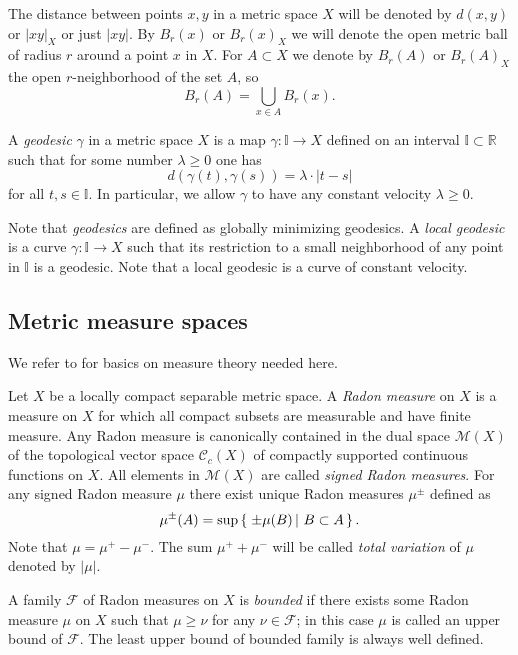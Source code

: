 \documentclass[12pt,leqno,intlimits]{amsart}
\numberwithin{equation}{section}
\theoremstyle{definition}
\theoremstyle{remark}
\newcommand{\R}{\mathbb{R}}
\newcommand{\II}{\mathbb{I}}
\def\:{\colon}
\newcommand*{\set}[2]{\left\{\,\left.{#1}\vphantom{#2}\,\right|\,{#2}\,\right\}}
\begin{document}
The distance between points $x,y$ in a metric space $X$ will be denoted by $d(x,y)$ or $|xy|_X$ or just $|xy|$. %
By $B_r(x)$ or $B_r(x)_X$ we will denote the open metric ball of radius $r$ around a point $x$ in $X$. 
For $A\subset X$ we denote by $B_r(A)$ or $B_r(A)_X$ the open $r$-neighborhood of the set $A$, so
\[B_r (A) =\bigcup_{x\in A} B_r (x).\]

A \emph{geodesic} $\gamma$ in a metric space $X$ is  a map $\gamma\:\II\to X$ defined on an interval $\II \subset \R$ such that for some number $\lambda \geq 0$ one has
\[d(\gamma (t),\gamma (s)) =\lambda \cdot |t-s|\] 
for all $t,s\in \II$. 
In particular, we allow $\gamma$ to have any constant velocity $\lambda \geq 0$. 

Note that \emph{geodesics} are defined as globally minimizing geodesics.
A \emph{local geodesic} is a curve $\gamma\: \II\to X$ such that its restriction to a small neighborhood of any point in $\II$ is  a geodesic. 
Note that a local geodesic is a curve of constant velocity.

\subsection{Metric measure spaces}
We refer to \cite{Federer} for basics on measure theory needed here.

Let $X$ be a locally compact separable metric space. 
A \emph{Radon measure} on $X$ is a measure on $X$ for which all compact subsets are measurable and have finite measure.
Any Radon measure is canonically contained in the dual space $\mathcal M(X)$ of the topological vector space $\mathcal C_c (X)$ of compactly supported continuous functions on $X$.
All elements in $\mathcal M(X)$ are called \emph{signed Radon measures}. 
For any signed Radon measure $\mu$ there exist unique Radon measures $\mu ^{\pm}$ defined as 
\[\mu^\pm(A)=\sup\set{\pm\mu(B)}{B\subset A}.\]
Note that $\mu =\mu^+- \mu^-$.
The sum $\mu^+ +\mu^-$ will be called \emph{total variation} of $\mu$ denoted by $|\mu |$.



A family   $\mathcal F$ of Radon measures on $X$ is \emph{bounded} if there exists some Radon measure $\mu$ on $X$ such that $\mu \geq \nu $ for any $\nu \in \mathcal F$;
in this case $\mu$ is called an upper bound of $ \mathcal F$.
The least upper bound of bounded family is always well defined.
\end{document}
